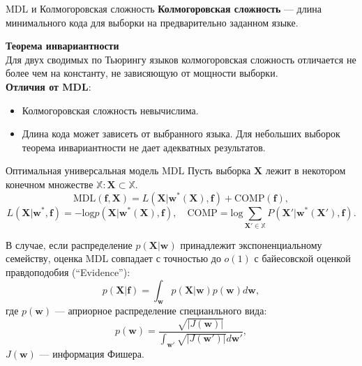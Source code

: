 \documentclass[10pt,pdf,utf8,russian,aspectratio=169]{beamer}
\begin{document}
\begin{frame}{MDL и Колмогоровская сложность}
\textbf{Колмогоровская сложность} --- длина минимального кода для выборки на предварительно заданном языке.

\textbf{Теорема инвариантности}\\
Для двух сводимых по Тьюрингу языков колмогоровская сложность  отличается не более чем на константу, не зависяющую от мощности выборки.\\

\textbf{Отличия от MDL}:
\begin{itemize}
\item Колмогоровская сложность невычислима.
\item Длина кода может зависеть от выбранного языка. Для небольших выборок теорема инвариантности не дает адекватных результатов.
\end{itemize}
\end{frame}

\begin{frame}{Оптимальная универсальная модель MDL}
Пусть выборка $\mathbf{X}$ лежит в некотором конечном множестве $\mathbb{X}: \mathbf{X} \subset \mathbb{X}$.
\[
\text{MDL}(\mathbf{f}, \mathbf{X}) = L(\mathbf{X}|\mathbf{w}^*(\mathbf{X}), \mathbf{f}) + \text{COMP}(\mathbf{f}),
\]
$$ L(\mathbf{X}|\mathbf{w}^*, \mathbf{f}) = -\text{log}p(\mathbf{X}|\mathbf{w}^*(\mathbf{X}), \mathbf{f}), \quad 
\text{COMP} = \text{log} \sum_{\mathbf{X}' \in \mathbb{X}} P(\mathbf{X}'|\mathbf{w}^*(\mathbf{X}'), \mathbf{f}).$$

В случае, если распределение $p(\mathbf{X}|\mathbf{w})$ принадлежит экспоненциальному семейству, оценка MDL совпадает с точностью до $o(1)$ с байесовской оценкой правдоподобия (``Evidence''):
\[
	p(\mathbf{X}|\mathbf{f}) = \int_\mathbf{w} p(\mathbf{X}|\mathbf{w})p(\mathbf{w}) d\mathbf{w},
\]
где $p(\mathbf{w})$ --- априорное распределение специанльного вида:
$$
	p(\mathbf{w}) = \frac{\sqrt{|J(\mathbf{w})|}}{\int_{\mathbf{w}'} \sqrt{|J(\mathbf{w'})|}d\mathbf{w'}},
$$
$J(\mathbf{w})$  --- информация Фишера.
\end{frame}	
\end{document}
